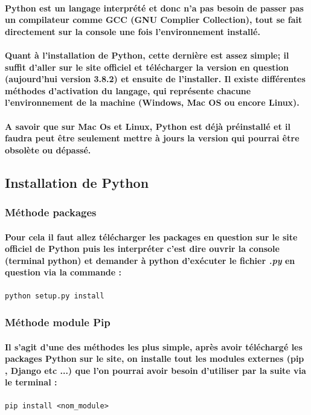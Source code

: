 \documentclass[a4paper, 12pt, twoside]{article}
\begin{document}
\paragraph{Python est un langage interprété et donc n'a pas besoin de passer pas un compilateur comme GCC (GNU Complier Collection), tout se fait directement sur la console une fois l'environnement installé.}
\paragraph{Quant à l'installation de Python, cette dernière est assez simple; il suffit d'aller sur le site officiel et télécharger la version en question (aujourd'hui version 3.8.2) et ensuite de l'installer. Il existe différentes méthodes d'activation du langage, qui représente chacune l'environnement de la machine (Windows, Mac OS ou encore Linux).}
\paragraph{A savoir que sur Mac Os et Linux, Python est déjà préinstallé et il faudra peut être seulement mettre à jours la version qui pourrai être obsolète ou dépassé.}

\subsection{Installation de Python} 
\subsubsection{Méthode packages}
\paragraph{Pour cela il faut allez télécharger les packages en question sur le site officiel de Python puis les interpréter c'est dire ouvrir la console (terminal python) et demander à python d'exécuter le fichier \textit{.py} en question via la commande :}
\begin{verbatim}
python setup.py install
\end{verbatim} 

\subsubsection{Méthode module Pip} 
\paragraph{Il s'agit d'une des méthodes les plus simple, après avoir téléchargé les packages Python sur le site, on installe tout les modules externes (pip , Django etc ...)  que l'on pourrai avoir besoin d'utiliser par la suite via le terminal : }
\begin{verbatim}
pip install <nom_module>
\end{verbatim}
\end{document}
